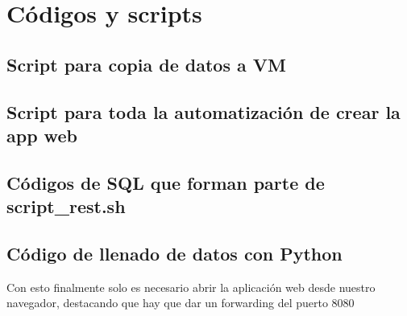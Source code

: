 \documentclass[10pt,executivepaper]{article}
\begin{document}
\section{Códigos y scripts}
\subsection{Script para copia de datos a VM}

\subsection{Script para toda la automatización de crear la app web}

\subsection{Códigos de SQL que forman parte de script\_rest.sh}



\subsection{Código de llenado de datos con Python}


Con esto finalmente solo es necesario abrir la aplicación web desde nuestro navegador, destacando que hay que dar un forwarding del puerto 8080
\end{document}
